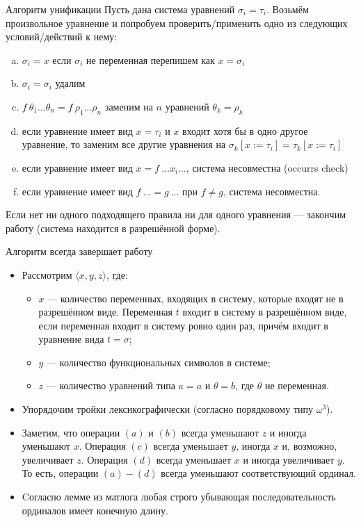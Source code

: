 \documentclass[aspectratio=169]{beamer}
\begin{document}
\begin{frame}{Алгоритм унификации}
Пусть дана система уравнений $\sigma_i = \tau_i$. 
Возьмём произвольное уравнение и попробуем проверить/применить одно из следующих условий/действий к нему:

		\begin{enumerate}[(a)]
		\item $\sigma_i=x$ если $\sigma_i$ не переменная перепишем как $x=\sigma_i$
		\item $\sigma_i = \sigma_i$ удалим
		\item $f\:\theta_1\hdots\theta_n=f\:\rho_1\hdots\rho_n$ заменим на $n$ уравнений $\theta_k = \rho_k$
		\item если уравнение имеет вид $x=\tau_i$ и $x$ входит хотя бы в одно другое уравнение, то заменим все другие уравнения на $\sigma_k[x := \tau_i] = \tau_k[x := \tau_i]$
		\item если уравнение имеет вид $x = f\ \dots x_i \dots$, система несовместна (occurrs check)
		\item если уравнение имеет вид $f\ ... = g\ ...$ при $f \ne g$, система несовместна.
		\end{enumerate}

Если нет ни одного подходящего правила ни для одного уравнения --- закончим работу (система находится в разрешённой форме).
\end{frame}

\begin{frame}{Алгоритм всегда завершает работу}
\begin{itemize}
\item Рассмотрим $\langle x,y,z \rangle$,
где:
\begin{itemize}\item $x$ --- количество переменных, входящих в систему, которые входят не в разрешённом виде.
Переменная $t$ входит в систему в разрешённом виде, если переменная входит в систему ровно один раз, причём входит в уравнение вида $t = \sigma$;
\item $y$ --- количество функциональных символов в системе;
\item $z$ --- количество уравнений типа $a=a$ и $\theta=b$, где $\theta$ не переменная.
\end{itemize}
\item Упорядочим тройки лексикографически (согласно порядковому типу $\omega^3$).

\item Заметим, что операции $(a)$ и $(b)$ всегда уменьшают $z$ и иногда уменьшают $x$.
Операция $(c)$ всегда уменьшает $y$, иногда $x$ и, возможно, увеличивает $z$.
Операция $(d)$ всегда уменьшает $x$ и иногда увеличивает $y$. То есть, операции $(a)-(d)$ всегда уменьшают
соответствующий ординал.

\item Cогласно лемме из матлога любая строго убывающая последовательность ординалов имеет конечную длину.
\end{itemize}
\end{frame}
\end{document}
